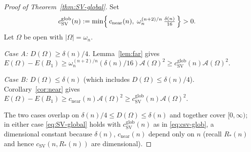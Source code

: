 \documentclass[11pt]{amsart}
\theoremstyle{definition}
\newcommand{\Om}{\Omega}
\newcommand{\Fr}{\mathcal A}
\newcommand{\abs}[1]{\left|#1\right|}
\begin{document}
\begin{proof}[Proof of Theorem~\ref{thm:SV-global}]
Set
\begin{equation}\label{eq:csv-glob}
   c_{\mathrm{SV}}^{\mathrm{glob}}(n)
   :=\min\Bigl\{\,c_{\mathrm{near}}(n),\;
   \omega_n^{(n+2)/n}\,\tfrac{\delta(n)}{16}\,\Bigr\}>0 .
\end{equation}
Let $\Om$ be open with $\abs{\Om}=\omega_n$.

\emph{Case A: $D(\Om)\ge\delta(n)/4$.} Lemma~\ref{lem:far} gives
$E(\Om)-E(B_1)\ge\omega_n^{(n+2)/n}(\delta(n)/16)\Fr(\Om)^2
\ge c_{\mathrm{SV}}^{\mathrm{glob}}(n)\Fr(\Om)^2$.

\emph{Case B: $D(\Om)\le\delta(n)$} (which includes
$D(\Om)\le\delta(n)/4$). Corollary~\ref{cor:near} gives
$E(\Om)-E(B_1)\ge c_{\mathrm{near}}(n)\Fr(\Om)^2
\ge c_{\mathrm{SV}}^{\mathrm{glob}}(n)\Fr(\Om)^2$.

The two cases overlap on $\delta(n)/4\le D(\Om)\le\delta(n)$ and together
cover $[0,\infty)$; in either case \eqref{eq:SV-global} holds with
$c_{\mathrm{SV}}^{\mathrm{glob}}(n)$ as in \eqref{eq:csv-glob}, a
dimensional constant because $\delta(n)$, $c_{\mathrm{near}}(n)$ depend
only on $n$ (recall $R_*(n)$ and hence $c_{\mathrm{SV}}(n,R_*(n))$ are
dimensional).


\end{proof}
\end{document}
